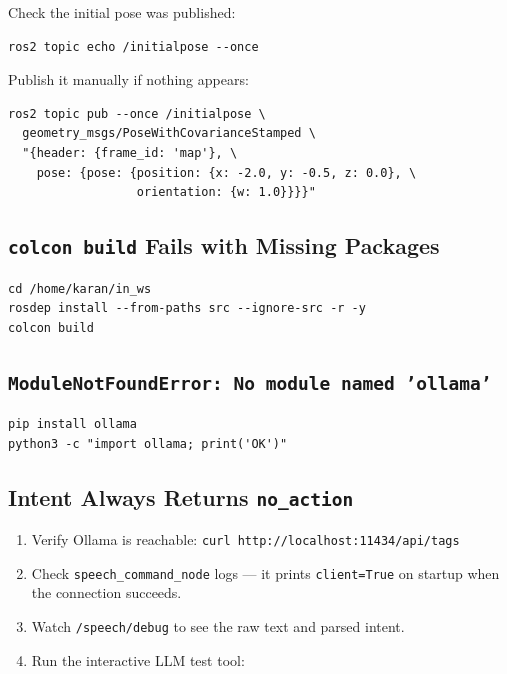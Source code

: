 \documentclass[12pt,a4paper]{report}
\newcommand{\topic}[1]{\texttt{\color{purple!80!black}#1}}
\newcommand{\node}[1]{\texttt{\color{Maroon}#1}}
\begin{document}
Check the initial pose was published:

\begin{lstlisting}[style=bashstyle]
ros2 topic echo /initialpose --once
\end{lstlisting}

Publish it manually if nothing appears:

\begin{lstlisting}[style=bashstyle]
ros2 topic pub --once /initialpose \
  geometry_msgs/PoseWithCovarianceStamped \
  "{header: {frame_id: 'map'}, \
    pose: {pose: {position: {x: -2.0, y: -0.5, z: 0.0}, \
                  orientation: {w: 1.0}}}}"
\end{lstlisting}

\subsection{\texttt{colcon build} Fails with Missing Packages}

\begin{lstlisting}[style=bashstyle]
cd /home/karan/in_ws
rosdep install --from-paths src --ignore-src -r -y
colcon build
\end{lstlisting}

\subsection{\texttt{ModuleNotFoundError: No module named 'ollama'}}

\begin{lstlisting}[style=bashstyle]
pip install ollama
python3 -c "import ollama; print('OK')"
\end{lstlisting}

\subsection{Intent Always Returns \texttt{no\_action}}

\begin{enumerate}[leftmargin=2em]
  \item Verify Ollama is reachable: \texttt{curl http://localhost:11434/api/tags}
  \item Check \node{speech\_command\_node} logs --- it prints \texttt{client=True}
        on startup when the connection succeeds.
  \item Watch \topic{/speech/debug} to see the raw text and parsed intent.
  \item Run the interactive LLM test tool:
\end{enumerate}
\end{document}
